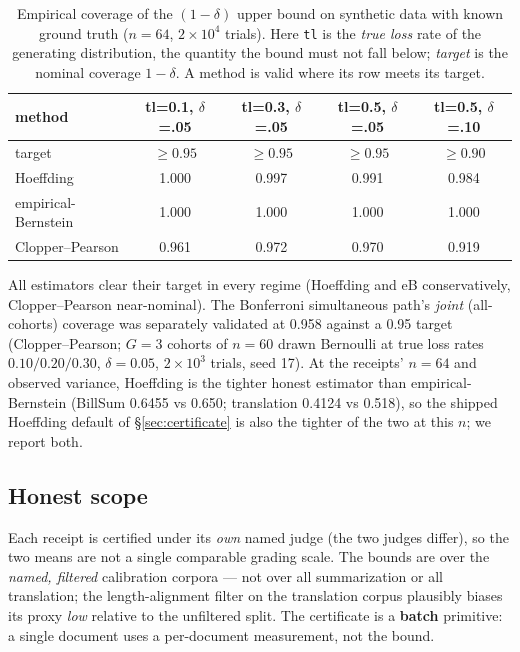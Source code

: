 \documentclass[11pt]{article}
\theoremstyle{definition}
\begin{document}
\begin{table}[htbp]
\centering
\begin{tabular}{@{}lcccc@{}}
\toprule
method & tl=0.1, $\delta$=.05 & tl=0.3, $\delta$=.05 & tl=0.5, $\delta$=.05 & tl=0.5, $\delta$=.10 \\
\midrule
target & $\ge 0.95$ & $\ge 0.95$ & $\ge 0.95$ & $\ge 0.90$ \\
Hoeffding & 1.000 & 0.997 & 0.991 & 0.984 \\
empirical-Bernstein & 1.000 & 1.000 & 1.000 & 1.000 \\
Clopper--Pearson & 0.961 & 0.972 & 0.970 & 0.919 \\
\bottomrule
\end{tabular}
\caption{Empirical coverage of the $(1-\delta)$ upper bound on synthetic
data with known ground truth ($n=64$, $2\times 10^{4}$ trials). Here
\texttt{tl} is the \emph{true loss} rate of the generating distribution, the
quantity the bound must not fall below; \emph{target} is the nominal coverage
$1-\delta$. A method is valid where its row meets its target.}
\label{tab:coverage}
\end{table}

All estimators clear their target in every regime (Hoeffding and eB
conservatively, Clopper--Pearson near-nominal). The Bonferroni simultaneous
path's \emph{joint} (all-cohorts) coverage was separately validated at 0.958
against a 0.95 target (Clopper--Pearson; $G=3$ cohorts of $n=60$ drawn
Bernoulli at true loss rates $0.10/0.20/0.30$, $\delta=0.05$,
$2\times 10^{3}$ trials, seed 17). At the receipts' $n=64$ and observed variance,
Hoeffding is the tighter honest estimator than empirical-Bernstein (BillSum
0.6455 vs 0.650; translation 0.4124 vs 0.518), so the shipped Hoeffding default
of \S\ref{sec:certificate} is also the tighter of the two at this $n$; we
report both.

\subsection{Honest scope}\label{sec:scope}

Each receipt is certified under its \emph{own} named judge (the two judges
differ), so the two means are not a single comparable grading scale. The
bounds are over the \emph{named, filtered} calibration corpora --- not over
all summarization or all translation; the length-alignment filter on the
translation corpus plausibly biases its proxy \emph{low} relative to the
unfiltered split. The certificate is a \textbf{batch} primitive: a single
document uses a per-document measurement, not the bound.
\end{document}
